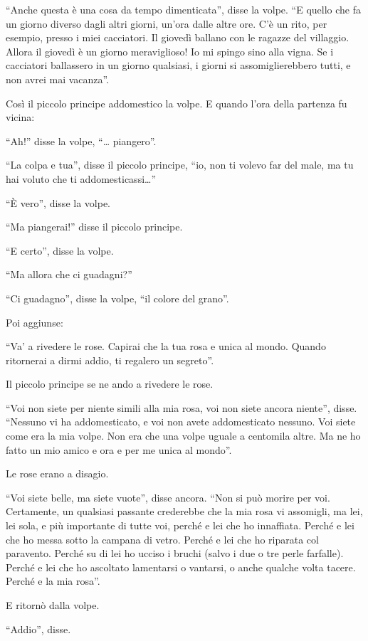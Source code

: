 \documentclass[11pt]{scrbook}
\begin{document}
``Anche questa è una cosa da tempo dimenticata'', disse la volpe. ``E
quello che fa un giorno diverso dagli altri giorni, un'ora dalle altre
ore. C'è un rito, per esempio, presso i miei cacciatori. Il giovedì
ballano con le ragazze del villaggio. Allora il giovedì è un giorno
meraviglioso! Io mi spingo sino alla vigna. Se i cacciatori ballassero
in un giorno qualsiasi, i giorni si assomiglierebbero tutti, e non avrei
mai vacanza''.

Così il piccolo principe addomestico la volpe. E quando l'ora della
partenza fu vicina:

``Ah!'' disse la volpe, ``\ldots{} piangero''.

``La colpa e tua'', disse il piccolo principe, ``io, non ti volevo far
del male, ma tu hai voluto che ti addomesticassi\ldots{}''

``È vero'', disse la volpe.

``Ma piangerai!'' disse il piccolo principe.

``E certo'', disse la volpe.

``Ma allora che ci guadagni?''

``Ci guadagno'', disse la volpe, ``il colore del grano''.

Poi aggiunse:

``Va' a rivedere le rose. Capirai che la tua rosa e unica al mondo.
Quando ritornerai a dirmi addio, ti regalero un segreto''.

Il piccolo principe se ne ando a rivedere le rose.

``Voi non siete per niente simili alla mia rosa, voi non siete ancora
niente'', disse. ``Nessuno vi ha addomesticato, e voi non avete
addomesticato nessuno. Voi siete come era la mia volpe. Non era che una
volpe uguale a centomila altre. Ma ne ho fatto un mio amico e ora e per
me unica al mondo''.

Le rose erano a disagio.

``Voi siete belle, ma siete vuote'', disse ancora. ``Non si può morire
per voi. Certamente, un qualsiasi passante crederebbe che la mia rosa vi
assomigli, ma lei, lei sola, e più importante di tutte voi, perché e lei
che ho innaffiata. Perché e lei che ho messa sotto la campana di vetro.
Perché e lei che ho riparata col paravento. Perché su di lei ho ucciso i
bruchi (salvo i due o tre perle farfalle). Perché e lei che ho ascoltato
lamentarsi o vantarsi, o anche qualche volta tacere. Perché e la mia
rosa''.

E ritornò dalla volpe.

``Addio'', disse.
\end{document}
